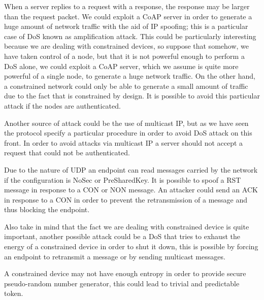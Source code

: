 	When a server replies to a request with a response, the response may be larger than the request packet.\newline
	We could exploit a CoAP server in order to generate a huge amount of network traffic with the aid of IP spoofing; this is a particular case of DoS known as amplification attack.\newline
	This could be particularly interesting because we are dealing with constrained devices, so suppose that somehow, we have taken control of a node, but that it is not powerful enough to perform a DoS alone, we could exploit a CoAP server, which we assume is quite more powerful of a single node, to generate a huge network traffic.\newline
	On the other hand, a constrained network could only be able to generate a small amount of traffic due to the fact that is constrained by design.\newline
	It is possible to avoid this particular attack if the nodes are authenticated.\newline
	
	Another source of attack could be the use of multicast IP, but as we have seen the protocol specify a particular procedure in order to avoid DoS attack on this front.\newline
	In order to avoid attacks via multicast IP a server should not accept a request that could not be authenticated.
	
	Due to the nature of UDP an endpoint can read messages carried by the network if the configuration is NoSec or PreSharedKey.\newline
	It is possible to spoof a RST message in response to a CON or NON message.
	An attacker could send an ACK in response to a CON in order to prevent the retransmission of a message and thus blocking the endpoint.\newline
	
	Also take in mind that the fact we are dealing with constrained device is quite important, another possible attack could be a DoS that tries to exhaust the energy of a constrained device in order to shut it down, this is possible by forcing an endpoint to retransmit a message or by sending multicast messages.\newline
	
	A constrained device may not have enough entropy in order to provide secure pseudo-random number generator, this could lead to trivial and predictable token.\newline
	

